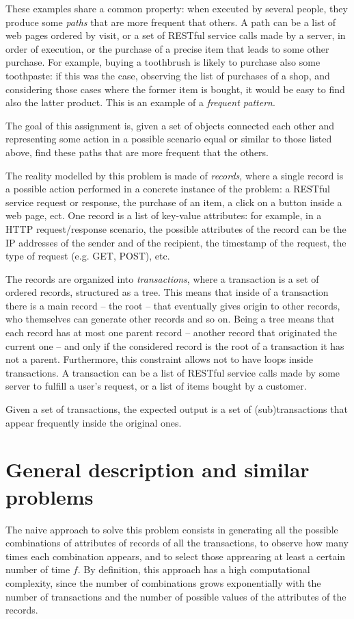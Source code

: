 \documentclass{acm_proc_article-sp-sigmod09}
\begin{document}
These examples share a common property: when executed by several people, they produce some \emph{paths} that are more frequent that others. A path can be a list of web pages ordered by visit, or a set of RESTful service calls made by a server, in order of execution, or the purchase of a precise item that leads to some other purchase. For example, buying a toothbrush is likely to purchase also some toothpaste: if this was the case, observing the list of purchases of a shop, and considering those cases where the former item is bought, it would be easy to find also the latter product. This is an example of a \emph{frequent pattern}.

The goal of this assignment is, given a set of objects connected each other and representing some action in a possible scenario equal or similar to those listed above, find these paths that are more frequent that the others. 

The reality modelled by this problem is made of \emph{records}, where a single record is a possible action performed in a concrete instance of the problem: a RESTful service request or response, the purchase of an item, a click on a button inside a web page, ect. One record is a list of key-value attributes: for example, in a HTTP request/response scenario, the possible attributes of the record can be the IP addresses of the sender and of the recipient, the timestamp of the request, the type of request (e.g. GET, POST), etc. 

The records are organized into \emph{transactions}, where a transaction is a set of ordered records, structured as a tree. This means that inside of a transaction there is a main record -- the root -- that eventually gives origin to other records, who themselves can generate other records and so on. Being a tree means that each record has at most one parent record -- another record that originated the current one -- and only if the considered record is the root of a transaction it has not a parent. Furthermore, this constraint allows not to have loops inside transactions. A transaction can be a list of RESTful service calls made by some server to fulfill a user's request, or a list of items bought by a customer.

Given a set of transactions, the expected output is a set of (sub)transactions that appear frequently inside the original ones.

\section{General description and similar problems}
The naive approach to solve this problem consists in generating all the possible combinations of attributes of records of all the transactions, to observe how many times each combination appears, and to select those apprearing at least a certain number of time $f$. By definition, this approach has a high computational complexity, since the number of combinations grows exponentially with the number of transactions and the number of possible values of the attributes of the records.
\end{document}
